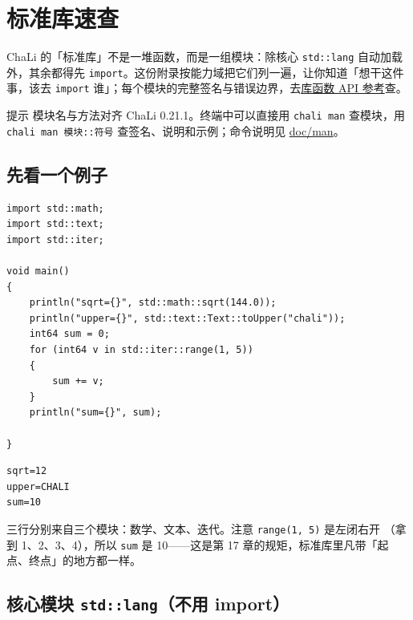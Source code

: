 \chapter{标准库速查}
\label{ch:appB}

ChaLi 的「标准库」不是一堆函数，而是一组模块：除核心 \texttt{std:\allowbreak{}:\allowbreak{}lang} 自动加载外，其余都得先 \texttt{import}。这份附录按能力域把它们列一遍，让你知道「想干这件事，该去 \texttt{import} 谁」；每个模块的完整签名与错误边界，去\href{https://gitee.com/rabbitc999/chali/blob/master/doc/library/README.md}{库函数 API 参考}查。

\begin{tip}{提示}
模块名与方法对齐 ChaLi 0.21.1。终端中可以直接用 \texttt{chali man} 查模块，用\texttt{chali man 模块:\allowbreak{}:\allowbreak{}符号} 查签名、说明和示例；命令说明见 \href{https://gitee.com/rabbitc999/chali/blob/master/doc/man/README.md}{doc/man}。
\end{tip}

\section{先看一个例子}

\par
\medskip
\begin{lstlisting}[style=chali]
import std::math;
import std::text;
import std::iter;

void main()
{
    println("sqrt={}", std::math::sqrt(144.0));
    println("upper={}", std::text::Text::toUpper("chali"));
    int64 sum = 0;
    for (int64 v in std::iter::range(1, 5))
    {
        sum += v;
    }
    println("sum={}", sum);

}
\end{lstlisting}
\par
\medskip

\par
\medskip
\begin{lstlisting}[style=out]
sqrt=12
upper=CHALI
sum=10
\end{lstlisting}
\par
\medskip

三行分别来自三个模块：数学、文本、迭代。注意 \texttt{range(\allowbreak{}1,\allowbreak{} 5)\allowbreak{}} 是左闭右开 （拿到 1、2、3、4），所以 \texttt{sum} 是 10——这是第 17 章的规矩，标准库里凡带「起点、终点」的地方都一样。

\section{核心模块 \texttt{std:\allowbreak{}:\allowbreak{}lang}（不用 import）}

